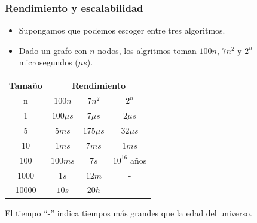 \documentclass{beamer}
\begin{document}
\begin{frame}
\frametitle{Rendimiento y escalabilidad}
\begin{itemize}
    \item{Supongamos que podemos escoger entre tres algoritmos.}
    \item{Dado un grafo con $n$ nodos, los algritmos toman $100n$, $7n^2$ y $2^n$ microsegundos ($\mu s$).}
\end{itemize}
\begin{center}
\begin{tabular}{|c|c|c|c|}
    \hline
    {\bf Tama\~no} & \multicolumn{3}{|c|}{\bf Rendimiento} \\
    \hline
    n & $100n$ & $7n^2$ & $2^n$ \\
    \hline
    1 & $100\mu s$ & $7\mu s$ & $2\mu s$ \\
    5 & $5ms$ & $175\mu s$ & $32\mu s$ \\
    10 & $1ms$ & $7ms$ & $1ms$ \\
    100 & $100ms$ & $7s$ & $10^{16}$ a\~nos \\
    1000 & $1s$ & $12m$ & - \\
    10000 & $10s$ & $20h$ & - \\
    \hline
\end{tabular}
\end{center}
\small{El tiempo ``-'' indica tiempos m\'as grandes que la edad del universo.}
\end{frame}
\end{document}
